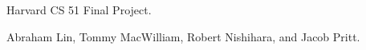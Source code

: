 Harvard CS 51 Final Project. \par
 Abraham Lin, Tommy MacWilliam, Robert Nishihara, and Jacob Pritt. \par
 
